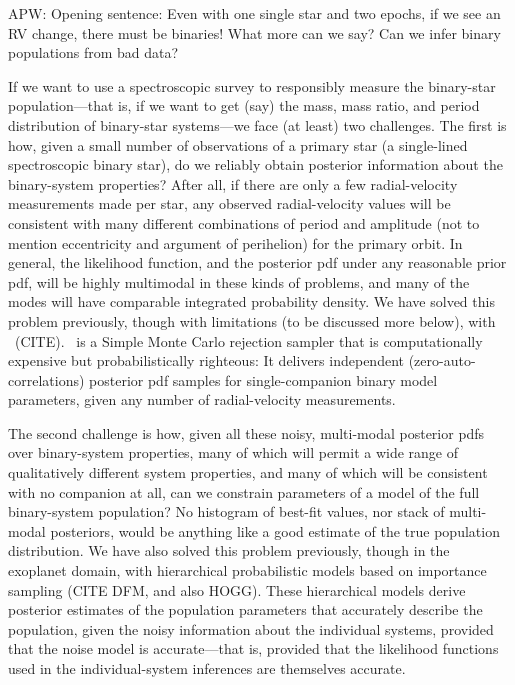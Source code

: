\documentclass[modern, letterpaper]{aastex61}
\newcommand{\thejoker}{\project{The~Joker}}
\begin{document}
APW: Opening sentence: Even with one single star and two epochs, if we
see an RV change, there must be binaries! What more can we say? Can we
infer binary populations from bad data?

If we want to use a spectroscopic survey to responsibly measure the
binary-star population---that is, if we want to get (say) the mass,
mass ratio, and period distribution of binary-star systems---we face
(at least) two challenges.
The first is how, given a small number of observations of a primary
star (a single-lined spectroscopic binary star), do we reliably obtain posterior
information about the binary-system properties?
After all, if there are only a few radial-velocity measurements made
per star, any observed radial-velocity values will be consistent with
many different combinations of period and amplitude (not to mention
eccentricity and argument of perihelion) for the primary orbit.
In general, the likelihood function, and the posterior pdf under any
reasonable prior pdf, will be highly multimodal in these kinds of
problems, and many of the modes will have comparable integrated
probability density.
We have solved this problem previously, though with limitations (to be
discussed more below), with \thejoker\ (CITE).
\thejoker\ is a Simple Monte Carlo rejection sampler that is
computationally expensive but probabilistically righteous: It delivers
independent (zero-auto-correlations) posterior pdf samples for
single-companion binary model parameters, given any number of
radial-velocity measurements.

The second challenge is how, given all these noisy, multi-modal
posterior pdfs over binary-system properties, many of which will
permit a wide range of qualitatively different system properties, and
many of which will be consistent with no companion at all, can we
constrain parameters of a model of the full binary-system population?
No histogram of best-fit values, nor stack of multi-modal posteriors,
would be anything like a good estimate of the true population
distribution.
We have also solved this problem previously, though in the exoplanet
domain, with hierarchical probabilistic models based on importance
sampling (CITE DFM, and also HOGG).
These hierarchical models derive posterior estimates of the population
parameters that accurately describe the population, given the noisy
information about the individual systems, provided that the noise
model is accurate---that is, provided that the likelihood functions
used in the individual-system inferences are themselves accurate.
\end{document}
